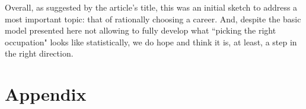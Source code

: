 \documentclass{article}
\begin{document}
Overall, as suggested by the article's title, this was an initial sketch to
address a most important topic: that of rationally choosing a career. And,
despite the basic model presented here not allowing to fully develop what
``picking the right occupation" looks like statistically, we do hope and think
it is, at least, a step in the right direction.

\newpage
\printbibliography[
    heading=bibintoc,
    title={References}
]

\newpage
\section*{Appendix}
\DetailedSkillSets
\end{document}
